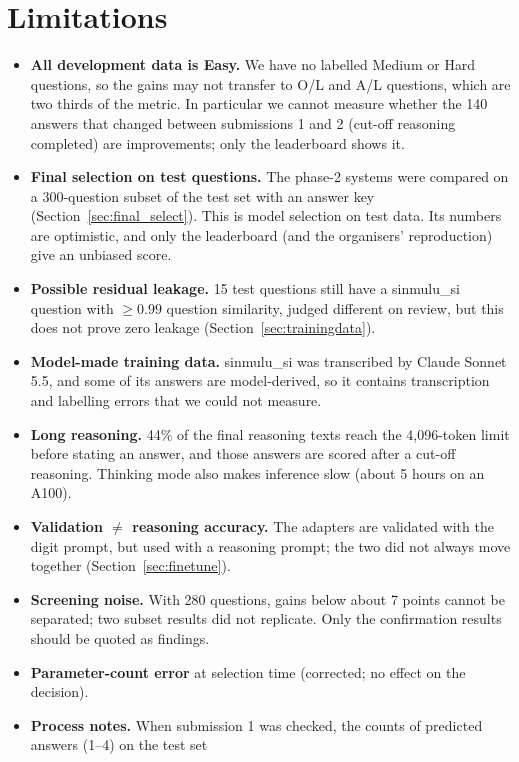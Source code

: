 \documentclass[10pt,a4paper]{article}
\begin{document}
\section{Limitations}\label{sec:limits}
\begin{itemize}
\item \textbf{All development data is Easy.} We have no labelled Medium or Hard questions, so the gains may not transfer
to O/L and A/L questions, which are two thirds of the metric. In particular we cannot measure whether the 140 answers
that changed between submissions 1 and 2 (cut-off reasoning completed) are improvements; only the leaderboard shows it.
\item \textbf{Final selection on test questions.} The phase-2 systems were compared on a 300-question subset of the
test set with an answer key (Section~\ref{sec:final_select}). This is model selection on test data. Its numbers are
optimistic, and only the leaderboard (and the organisers' reproduction) give an unbiased score.
\item \textbf{Possible residual leakage.} 15 test questions still have a sinmulu\_si question with $\ge 0.99$ question
similarity, judged different on review, but this does not prove zero leakage (Section~\ref{sec:trainingdata}).
\item \textbf{Model-made training data.} sinmulu\_si was transcribed by Claude Sonnet 5.5, and some of its answers are
model-derived, so it contains transcription and labelling errors that we could not measure.
\item \textbf{Long reasoning.} 44\% of the final reasoning texts reach the 4,096-token limit before stating an answer,
and those answers are scored after a cut-off reasoning. Thinking mode also makes inference slow (about 5 hours on an
A100).
\item \textbf{Validation $\neq$ reasoning accuracy.} The adapters are validated with the digit prompt, but used with a
reasoning prompt; the two did not always move together (Section~\ref{sec:finetune}).
\item \textbf{Screening noise.} With 280 questions, gains below about 7 points cannot be separated; two subset results
did not replicate. Only the confirmation results should be quoted as findings.
\item \textbf{Parameter-count error} at selection time (corrected; no effect on the decision).
\item \textbf{Process notes.} When submission 1 was checked, the counts of predicted answers (1--4) on the test set

\end{itemize}
\end{document}
